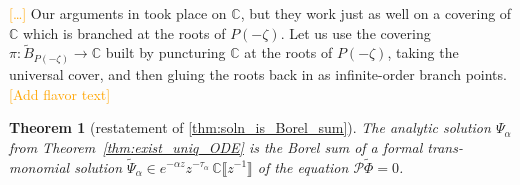 \documentclass{article}
\newcommand{\maps}{\colon}
\newcommand{\C}{\mathbb{C}}
\newcommand{\series}[1]{\tilde{#1}}
\theoremstyle{definition}
\theoremstyle{plain}
\newtheorem{theorem}{Theorem}[section]
\begin{document}
\textcolor{orange}{[\ldots]} Our arguments in \cite{reg-sing-volterra} took place on $\C$, but they work just as well on a covering of $\C$ which is branched at the roots of $P(-\zeta)$. Let us use the covering $\pi \maps \widetilde{B}_{P(-\zeta)} \to \C$ built by puncturing $\C$ at the roots of $P(-\zeta)$, taking the universal cover, and then gluing the roots back in as infinite-order branch points.
\color{DarkBlue}
\textcolor{orange}{[Add flavor text]}
\begin{theorem}[restatement of \ref{thm:soln_is_Borel_sum}]\label{re:thm:soln_is_Borel_sum}
The analytic solution $\Psi_\alpha$ from Theorem~\ref{thm:exist_uniq_ODE} is the Borel sum of a formal trans-monomial solution $\series{\Psi}_\alpha \in e^{-\alpha z} z^{-\tau_\alpha}\,\C \llbracket z^{-1} \rrbracket$ of the equation $\mathcal{P}\series{\Phi} = 0$.
\end{theorem}
\end{document}
